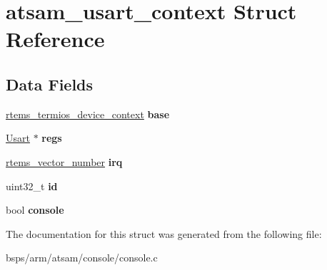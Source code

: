 \hypertarget{structatsam__usart__context}{}\section{atsam\+\_\+usart\+\_\+context Struct Reference}
\label{structatsam__usart__context}
\subsection*{Data Fields}
\begin{DoxyCompactItemize}
\item 
\mbox{\label{structatsam__usart__context_ae28084c8adcc7ec32cddec20dbac3843}} 
\mbox{\hyperlink{structrtems__termios__device__context}{rtems\+\_\+termios\+\_\+device\+\_\+context}} {\bfseries base}
\item 
\mbox{\label{structatsam__usart__context_a5a56ec7bb5977469dff7bc42e712a572}} 
\mbox{\hyperlink{structUsart}{Usart}} $\ast$ {\bfseries regs}
\item 
\mbox{\label{structatsam__usart__context_ae4d027dd91a883117b0bb00b8e40fda5}} 
\mbox{\hyperlink{group__ClassicINTR_ga3e434c197d99f128e78cae4d9358bd8b}{rtems\+\_\+vector\+\_\+number}} {\bfseries irq}
\item 
\mbox{\label{structatsam__usart__context_a7aaa360c37e4c85437815605362c2999}} 
uint32\+\_\+t {\bfseries id}
\item 
\mbox{\label{structatsam__usart__context_a9dc41d21037af9d5829e2ad66831ce2e}} 
bool {\bfseries console}
\end{DoxyCompactItemize}


The documentation for this struct was generated from the following file\+:\begin{DoxyCompactItemize}
\item 
bsps/arm/atsam/console/console.\+c\end{DoxyCompactItemize}
